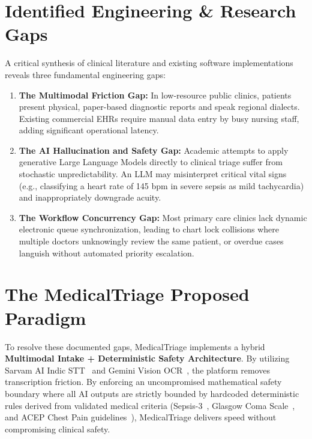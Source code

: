 \documentclass[11pt,a4paper,oneside]{report}
\begin{document}
\section{Identified Engineering \& Research Gaps}
A critical synthesis of clinical literature and existing software implementations reveals three fundamental engineering gaps:
\begin{enumerate}[leftmargin=20pt]
  \item \textbf{The Multimodal Friction Gap:} In low-resource public clinics, patients present physical, paper-based diagnostic reports and speak regional dialects. Existing commercial EHRs require manual data entry by busy nursing staff, adding significant operational latency.
  \item \textbf{The AI Hallucination and Safety Gap:} Academic attempts to apply generative Large Language Models directly to clinical triage suffer from stochastic unpredictability. An LLM may misinterpret critical vital signs (e.g., classifying a heart rate of 145 bpm in severe sepsis as mild tachycardia) and inappropriately downgrade acuity.
  \item \textbf{The Workflow Concurrency Gap:} Most primary care clinics lack dynamic electronic queue synchronization, leading to chart lock collisions where multiple doctors unknowingly review the same patient, or overdue cases languish without automated priority escalation.
\end{enumerate}

\section{The MedicalTriage Proposed Paradigm}
To resolve these documented gaps, MedicalTriage implements a hybrid \textbf{Multimodal Intake + Deterministic Safety Architecture}. By utilizing Sarvam AI Indic STT~\cite{sarvam2024} and Gemini Vision OCR~\cite{gemini2023}, the platform removes transcription friction. By enforcing an uncompromised mathematical safety boundary where all AI outputs are strictly bounded by hardcoded deterministic rules derived from validated medical criteria (Sepsis-3~\cite{singer2016}, Glasgow Coma Scale~\cite{teasdale1974}, and ACEP Chest Pain guidelines~\cite{acep2018}), MedicalTriage delivers speed without compromising clinical safety.

\end{document}
